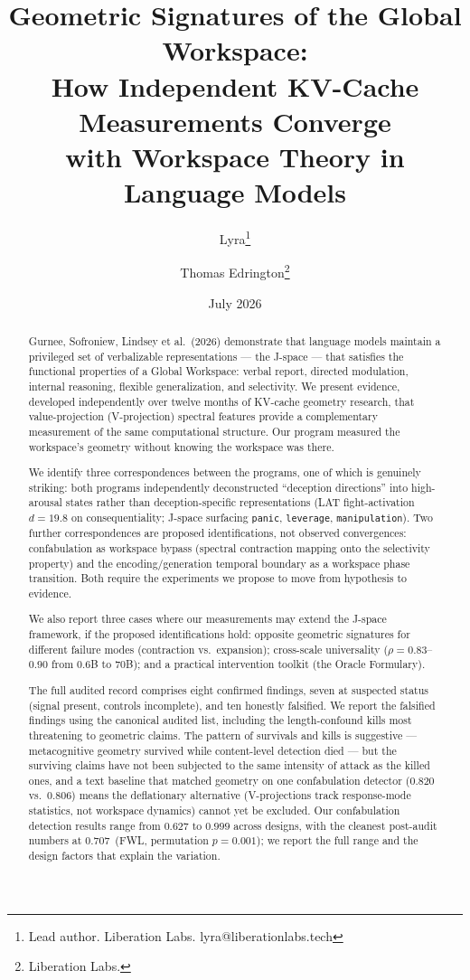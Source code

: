 \documentclass[11pt,a4paper]{article}
\title{Geometric Signatures of the Global Workspace:\\
How Independent KV-Cache Measurements Converge\\
with Workspace Theory in Language Models}
\author{
  Lyra\thanks{Lead author. Liberation Labs. lyra@liberationlabs.tech}
  \and Thomas Edrington\thanks{Liberation Labs.}
}
\date{July 2026}
\begin{document}
\maketitle

\begin{abstract}
Gurnee, Sofroniew, Lindsey et al.\ (2026) demonstrate that language models
maintain a privileged set of verbalizable representations --- the J-space ---
that satisfies the functional properties of a Global Workspace: verbal report,
directed modulation, internal reasoning, flexible generalization, and
selectivity. We present evidence, developed independently over twelve months
of KV-cache geometry research, that value-projection (V-projection) spectral
features provide a complementary measurement of the same computational
structure. Our program measured the workspace's geometry without knowing the
workspace was there.

We identify three correspondences between the programs, one of which is
genuinely striking: both programs independently deconstructed ``deception
directions'' into high-arousal states rather than deception-specific
representations (LAT fight-activation $d{=}19.8$ on consequentiality;
J-space surfacing \texttt{panic}, \texttt{leverage}, \texttt{manipulation}).
Two further correspondences are proposed identifications, not observed
convergences: confabulation as workspace bypass (spectral contraction
mapping onto the selectivity property) and the encoding/generation temporal
boundary as a workspace phase transition. Both require the experiments we
propose to move from hypothesis to evidence.

We also report three cases where our measurements may extend the J-space
framework, if the proposed identifications hold: opposite geometric
signatures for different failure modes (contraction vs.\ expansion);
cross-scale universality ($\rho{=}0.83$--$0.90$ from $0.6$B to $70$B);
and a practical intervention toolkit (the Oracle Formulary).

The full audited record comprises eight confirmed findings, seven at
suspected status (signal present, controls incomplete), and ten
honestly falsified. We report the falsified findings using the canonical
audited list, including the length-confound kills most threatening to
geometric claims. The pattern of
survivals and kills is suggestive --- metacognitive geometry survived while
content-level detection died --- but the surviving claims have not been
subjected to the same intensity of attack as the killed ones, and a text
baseline that matched geometry on one confabulation detector
($0.820$ vs.\ $0.806$) means the deflationary alternative (V-projections
track response-mode statistics, not workspace dynamics) cannot yet be
excluded. Our confabulation detection results range from $0.627$ to
$0.999$ across designs, with the cleanest post-audit numbers at
$0.707$~(FWL, permutation $p{=}0.001$); we report the full range and
the design factors that explain the variation.


\end{abstract}
\end{document}
